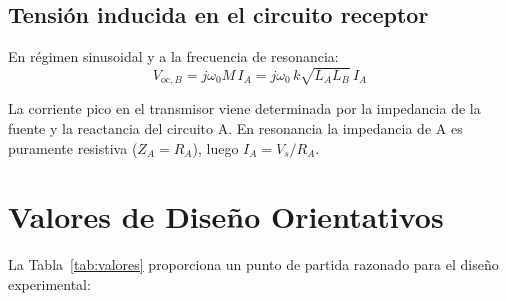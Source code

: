 \documentclass[11pt,a4paper]{article}
\begin{document}
\subsection{Tensión inducida en el circuito receptor}

En régimen sinusoidal y a la frecuencia de resonancia:
\begin{equation}
  V_{\text{oc},B} = j\omega_0 M \, I_A = j\omega_0 \, k \sqrt{L_A L_B}\, I_A
  \label{eq:VOC}
\end{equation}

La corriente pico en el transmisor viene determinada por la impedancia de la fuente y la
reactancia del circuito A. En resonancia la impedancia de A es puramente resistiva ($Z_A = R_A$),
luego $I_A = V_s / R_A$.

\section{Valores de Diseño Orientativos}

La Tabla~\ref{tab:valores} proporciona un punto de partida razonado para el diseño experimental:
\end{document}

